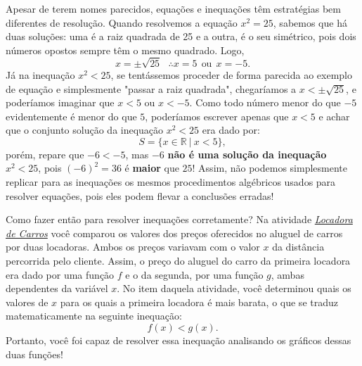 Apesar de terem nomes parecidos, equações e inequações têm estratégias bem diferentes de resolução. Quando resolvemos a equação $x^2 = 25$, sabemos que há duas soluções: uma é a raiz quadrada de 25 e a outra, é o seu simétrico, pois dois números opostos sempre têm o mesmo quadrado. Logo,
$$
x = \pm \sqrt{25} \ \ \ \therefore x = 5 \ \ \mbox{ou} \ \ x = -5.
$$
Já na inequação $x^2 <25$, se tentássemos proceder de forma parecida ao exemplo de equação e simplesmente "passar a raiz quadrada", chegaríamos a $x < \pm \sqrt{25}$, e poderíamos imaginar que $x < 5$ ou $x < -5$. Como todo número menor do que $-5$ evidentemente é menor do que $5$, poderíamos escrever apenas que $x<5$ e achar que o conjunto solução da inequação $x^2 < 25$ era dado por:
$$
S = \{x \in \mathbb{R} \ | \ x <5\},
$$ 
porém, repare que $-6 < -5$, mas $-6$ \textbf{não é uma solução da inequação} $x^2 <25$, pois $(-6)^2 = 36$ é \textbf{maior} que $25$! Assim, não podemos simplesmente replicar para as inequações os mesmos procedimentos algébricos usados para resolver equações, pois eles podem flevar a conclusões erradas!



Como fazer então para resolver inequações corretamente? Na atividade \emph{\hyperref[locadora]{Locadora de Carros}} você comparou os valores dos preços oferecidos no aluguel de carros por duas locadoras. Ambos os preços variavam com o valor $x$ da distância percorrida pelo cliente. Assim, o preço do aluguel do carro da primeira locadora era dado por uma função $f$ e o da segunda, por uma função $g$, ambas dependentes da variável $x$. No item  daquela atividade, você determinou quais os valores de $x$ para os quais a primeira locadora é mais barata, o que se traduz matematicamente na seguinte inequação:
$$
f(x) < g(x).
$$
Portanto, você foi capaz de resolver essa inequação analisando os gráficos dessas duas funções! 

